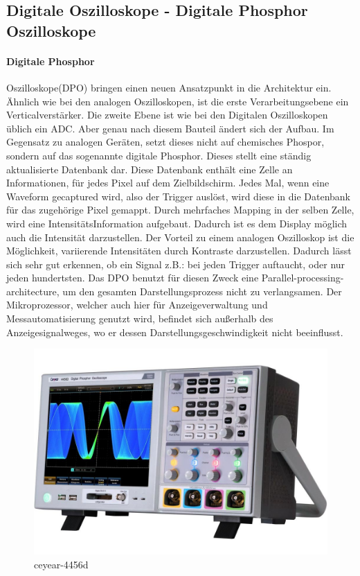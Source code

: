 \documentclass{article}
\begin{document}
\subsection{Digitale Oszilloskope - Digitale Phosphor Oszilloskope}
\paragraph{Digitale Phosphor}
Oszilloskope(DPO) bringen einen neuen Ansatzpunkt in die Architektur ein. Ähnlich wie bei den analogen Oszilloskopen, ist die erste Verarbeitungsebene ein Verticalverstärker. Die zweite Ebene ist wie bei den Digitalen Oszilloskopen üblich ein ADC. Aber genau nach diesem Bauteil ändert sich der Aufbau. Im Gegensatz zu analogen Geräten, setzt dieses nicht auf chemisches Phospor, sondern auf das sogenannte digitale Phosphor. Dieses stellt eine ständig aktualisierte Datenbank dar. Diese Datenbank enthält eine Zelle an Informationen, für jedes Pixel auf dem Zielbildschirm. Jedes Mal, wenn eine Waveform gecaptured wird, also der Trigger auslöst, wird diese in die Datenbank für das zugehörige Pixel gemappt. Durch mehrfaches Mapping in der selben Zelle, wird eine IntensitätsInformation aufgebaut. Dadurch ist es dem Display möglich auch die Intensität darzustellen. Der Vorteil zu einem analogen Oszilloskop ist die Möglichkeit, variierende Intensitäten durch Kontraste darzustellen. Dadurch lässt sich sehr gut erkennen, ob ein Signal z.B.: bei jeden Trigger auftaucht, oder nur jeden hundertsten. Das DPO benutzt für diesen Zweck eine Parallel-processing-architecture, um den gesamten Darstellungsprozess nicht zu verlangsamen. Der Mikroprozessor, welcher auch hier für Anzeigeverwaltung und Messautomatisierung genutzt wird, befindet sich außerhalb des Anzeigesignalweges, wo er dessen Darstellungsgeschwindigkeit nicht beeinflusst.\cite{mcclurel}
\begin{figure}[H]
  \includegraphics[width=\textwidth]{"ceyear-4456d"}
  \caption[\textbf{ceyear-4456d.jpg},  Quelle:https://www.meilhaus.de/en/ceyear-4456.htm (zuletzt abgerufen: 04.09.2021)]{ceyear-4456d}
\end{figure}
\newline
\end{document}
